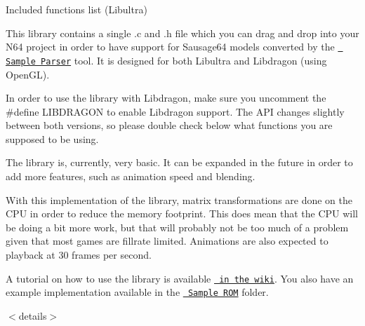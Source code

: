 Included functions list (Libultra)

This library contains a single .c and .h file which you can drag and drop into your N64 project in order to have support for Sausage64 models converted by the \href{../Sample\%20Parser}{\texttt{ Sample Parser}} tool. It is designed for both Libultra and Libdragon (using Open\+GL).

In order to use the library with Libdragon, make sure you uncomment the {\ttfamily \#define LIBDRAGON} to enable Libdragon support. The API changes slightly between both versions, so please double check below what functions you are supposed to be using.

The library is, currently, very basic. It can be expanded in the future in order to add more features, such as animation speed and blending.

With this implementation of the library, matrix transformations are done on the CPU in order to reduce the memory footprint. This does mean that the CPU will be doing a bit more work, but that will probably not be too much of a problem given that most games are fillrate limited. Animations are also expected to playback at 30 frames per second.

A tutorial on how to use the library is available \href{../../../wiki/5\%29-Sample-library-tutorial}{\texttt{ in the wiki}}. You also have an example implementation available in the \href{../Sample\%20ROM}{\texttt{ Sample ROM}} folder.

$<$details$>$ 


